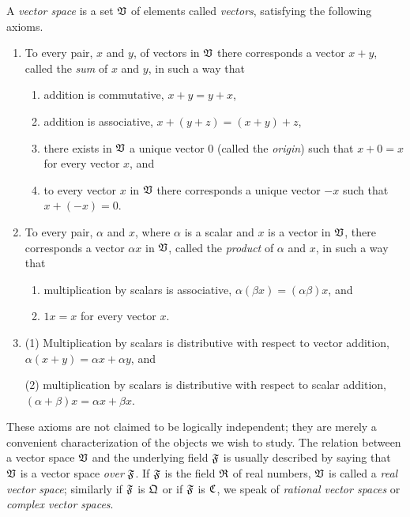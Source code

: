 \begin{definition}
    A \emph{vector space} is a set \(  \frak{V}\) of elements called \emph{vectors}, satisfying the following axioms.

    \begin{enumerate}[label=(\Alph*)]
        \item To every pair, \(x\) and \(y\), of vectors in \(  \frak{V}\) there corresponds a vector \(x + y\), called the \emph{sum} of \(x\) and \(y\), in such a way that
        \begin{enumerate}[label=(\arabic*)]
            \item addition is commutative, \(x + y = y + x\),
            \item addition is associative, \(x + (y + z) = (x + y) + z\),
            \item there exists in \(  \frak{V}\) a unique vector 0 (called the \emph{origin}) such that \(x + 0 = x\) for every vector \(x\), and
            \item to every vector \(x\) in \(  \frak{V}\) there corresponds a unique vector \(-x\) such that \(x + (-x) = 0\).
        \end{enumerate}
        \smallskip
        \item To every pair, \(\alpha\) and \(x\), where \(\alpha\) is a scalar and \(x\) is a vector in \(  \frak{V}\), there corresponds a vector \(\alpha x\) in \(  \frak{V}\), called the \emph{product} of \(\alpha\) and \(x\), in such a way that
        \begin{enumerate}[label=(\arabic*)]
            \item multiplication by scalars is associative, \(\alpha(\beta x) = (\alpha \beta)x\), and
            \item \(1x = x\) for every vector \(x\).
        \end{enumerate}
        \smallskip
        \item (1) Multiplication by scalars is distributive with respect to vector addition, \(\alpha(x + y) = \alpha x + \alpha y\), and
        
        (2) multiplication by scalars is distributive with respect to scalar addition, \((\alpha + \beta)x = \alpha x + \beta x\).
    \end{enumerate}
\end{definition}

These axioms are not claimed to be logically independent; they are merely a
convenient characterization of the objects we wish to study. The relation
between a vector space \(  \frak{V}\) and the underlying field \(\frak{F}\) is
usually described by saying that \(  \frak{V}\) is a vector space \emph{over}
\(\frak{F}\). If \(\frak{F}\) is the field \(\frak{R}\) of real numbers, \(  \frak{V}\)
is called a \emph{real vector space}; similarly if \(\frak{F}\) is \(\frak{Q}\)
or if \(\frak{F}\) is \(\frak{C}\), we speak of \emph{rational vector spaces} or
\emph{complex vector spaces}.


